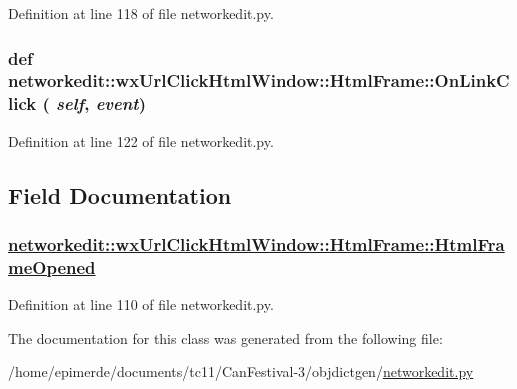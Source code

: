 Definition at line 118 of file networkedit.py.\hypertarget{classnetworkedit_1_1wxUrlClickHtmlWindow_1_1HtmlFrame_efef756beaf2cecc502b2f6c3c5386cb}{
\subsubsection[OnLinkClick]{\setlength{\rightskip}{0pt plus 5cm}def networkedit::wx\-Url\-Click\-Html\-Window::Html\-Frame::On\-Link\-Click ( {\em self},  {\em event})}}
\label{classnetworkedit_1_1wxUrlClickHtmlWindow_1_1HtmlFrame_efef756beaf2cecc502b2f6c3c5386cb}




Definition at line 122 of file networkedit.py.

\subsection{Field Documentation}
\hypertarget{classnetworkedit_1_1wxUrlClickHtmlWindow_1_1HtmlFrame_14f29033b3eec5b120495b5c24050939}{
\subsubsection[HtmlFrameOpened]{\setlength{\rightskip}{0pt plus 5cm}\hyperlink{classnetworkedit_1_1wxUrlClickHtmlWindow_1_1HtmlFrame_14f29033b3eec5b120495b5c24050939}{networkedit::wx\-Url\-Click\-Html\-Window::Html\-Frame::Html\-Frame\-Opened}}}
\label{classnetworkedit_1_1wxUrlClickHtmlWindow_1_1HtmlFrame_14f29033b3eec5b120495b5c24050939}




Definition at line 110 of file networkedit.py.

The documentation for this class was generated from the following file:\begin{CompactItemize}
\item 
/home/epimerde/documents/tc11/Can\-Festival-3/objdictgen/\hyperlink{networkedit_8py}{networkedit.py}\end{CompactItemize}
